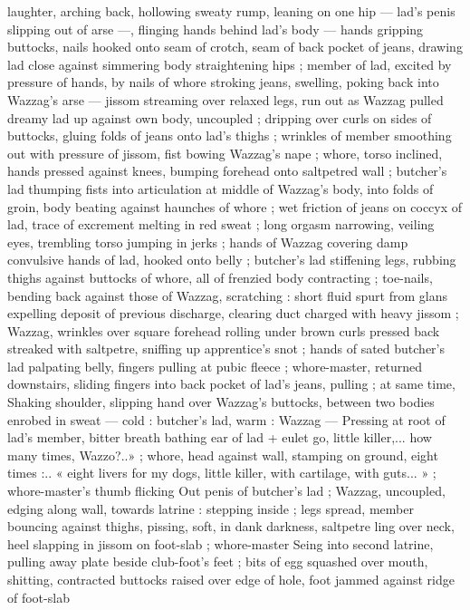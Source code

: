 laughter, arching back, hollowing sweaty rump, leaning on one hip ---
lad's penis slipping out of arse ---, flinging hands behind lad's body
--- hands gripping buttocks, nails hooked onto seam of crotch, seam
of back pocket of jeans, drawing lad close against simmering body
straightening hips ; member of lad, excited by pressure of hands, by
nails of whore stroking jeans, swelling, poking back into Wazzag's
arse --- jissom streaming over relaxed legs, run out as Wazzag pulled
dreamy lad up against own body, uncoupled ; dripping over curls on
sides of buttocks, gluing folds of jeans onto lad’s thighs ; wrinkles
of member smoothing out with pressure of jissom, fist bowing
Wazzag's nape ; whore, torso inclined, hands pressed against knees,
bumping forehead onto saltpetred wall ; butcher's lad thumping fists
into articulation at middle of Wazzag’s body, into folds of groin, body
beating against haunches of whore ; wet friction of jeans on coccyx
of lad, trace of excrement melting in red sweat ; long orgasm
narrowing, veiling eyes, trembling torso jumping in jerks ; hands of
Wazzag covering damp convulsive hands of lad, hooked onto belly ;
butcher's lad stiffening legs, rubbing thighs against buttocks of
whore, all of frenzied body contracting ; toe-nails, bending back
against those of Wazzag, scratching : short fluid spurt from glans
expelling deposit of previous discharge, clearing duct charged with
heavy jissom ; Wazzag, wrinkles over square forehead rolling under
brown curls pressed back streaked with saltpetre, sniffing up
apprentice’s snot ; hands of sated butcher's lad palpating belly,
fingers pulling at pubic fleece ; whore-master, returned downstairs,
sliding fingers into back pocket of lad’s jeans, pulling ; at same time,
Shaking shoulder, slipping hand over Wazzag's buttocks, between
two bodies enrobed in sweat --- cold : butcher's lad, warm : Wazzag
--- Pressing at root of lad's member, bitter breath bathing ear of lad
+ eulet go, little killer,... how many times, Wazzo?..» ; whore, head
against wall, stamping on ground, eight times :.. « eight livers for my
dogs, little killer, with cartilage, with guts... » ; whore-master's thumb
flicking Out penis of butcher's lad ; Wazzag, uncoupled, edging along
wall, towards latrine : stepping inside ; legs spread, member
bouncing against thighs, pissing, soft, in dank darkness, saltpetre
ling over neck, heel slapping in jissom on foot-slab ; whore-master
Seing into second latrine, pulling away plate beside club-foot's feet
; bits of egg squashed over mouth, shitting, contracted buttocks
raised over edge of hole, foot jammed against ridge of foot-slab
